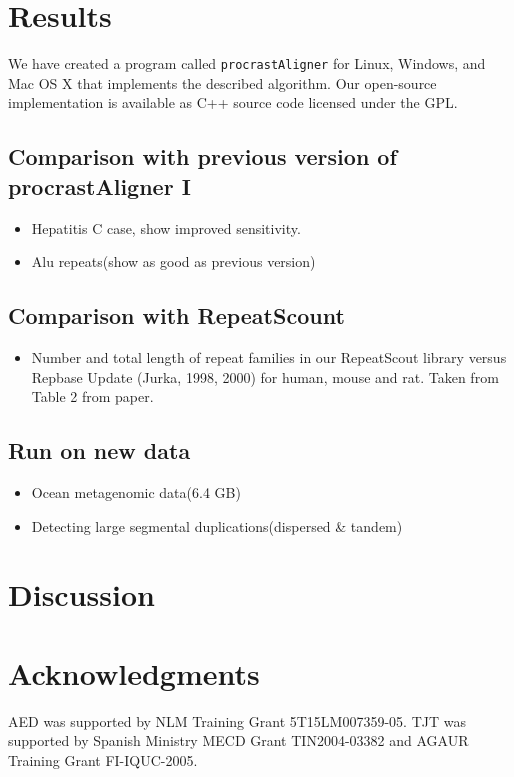 \documentclass{llncs}
\begin{document}
\section{Results}
We have created a program called \texttt{procrastAligner} for Linux,
Windows, and Mac OS X that implements the described algorithm. Our
open-source implementation is available as C++ source code licensed
under the GPL.

\subsection{Comparison with previous version of procrastAligner I}
\begin{itemize}

\item Hepatitis C case, show improved sensitivity.
\item Alu repeats(show as good as previous version)
 
\end{itemize}

 \subsection{Comparison with RepeatScount}
\begin{itemize}
\item Number and total length of repeat families in our RepeatScout
library versus Repbase Update (Jurka, 1998, 2000) for human, mouse
and rat. Taken from Table 2 from paper.
\end{itemize}

\subsection{Run on new data}
 \begin{itemize}
 \item Ocean metagenomic data(6.4 GB)
 \item Detecting large segmental duplications(dispersed \& tandem)
\end{itemize}

\section{Discussion}

\section{ Acknowledgments }
AED was supported by NLM Training Grant 5T15LM007359-05. TJT was
supported by Spanish Ministry MECD Grant TIN2004-03382 and AGAUR
Training Grant FI-IQUC-2005.
\end{document}
